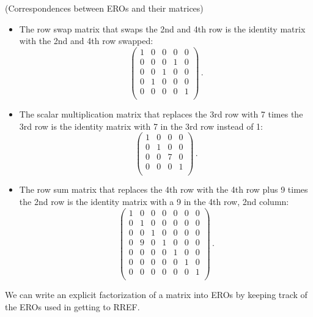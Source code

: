 \begin{example} (Correspondences between EROs and their matrices)
\begin{itemize}
\item The row swap matrix that swaps the 2nd and 4th row is the identity matrix with the 2nd and 4th row swapped: 
\[
\begin{pmatrix}
1&0&0&0&0\\
0&0&0&1&0\\
0&0&1&0&0\\
0&1&0&0&0\\
0&0&0&0&1\\
\end{pmatrix}\, .
\]
\item
The scalar multiplication matrix that replaces the 3rd row with 7 times the 3rd row is the identity matrix with 7 in the 3rd row instead of 1:
\[
\begin{pmatrix}
1&0&0&0\\
0&1&0&0\\
0&0&7&0\\
0&0&0&1\\
\end{pmatrix}\, .
\]

\item The row sum matrix that replaces the 4th row with the 4th row plus 9 times the 2nd row is the identity matrix with a 9 in the  4th row, 2nd column:
\[
\begin{pmatrix}
1&0&0&0&0&0&0\\
0&1&0&0&0&0&0\\
0&0&1&0&0&0&0\\
0&9&0&1&0&0&0\\
0&0&0&0&1&0&0\\
0&0&0&0&0&1&0\\
0&0&0&0&0&0&1\\
\end{pmatrix}\, .
\]
\end{itemize}
\end{example}

We can write an explicit factorization of a matrix into EROs by keeping track of the EROs used in getting to RREF.

